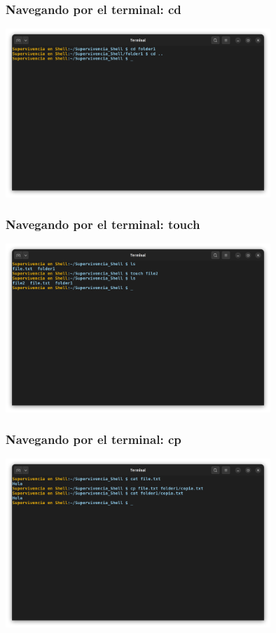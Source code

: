 \documentclass[10pt]{beamer}
\begin{document}
	\begin{frame}
		\frametitle{Navegando por el terminal: cd}
		\includegraphics[width=0.75\textwidth]{cd}
	\end{frame}
	
	\begin{frame}
		\frametitle{Navegando por el terminal: touch}
		\includegraphics[width=0.75\textwidth]{touch}
	\end{frame}
	
	\begin{frame}
		\frametitle{Navegando por el terminal: cp}
		\includegraphics[width=0.75\textwidth]{cp}
	\end{frame}	
		
\end{document}
